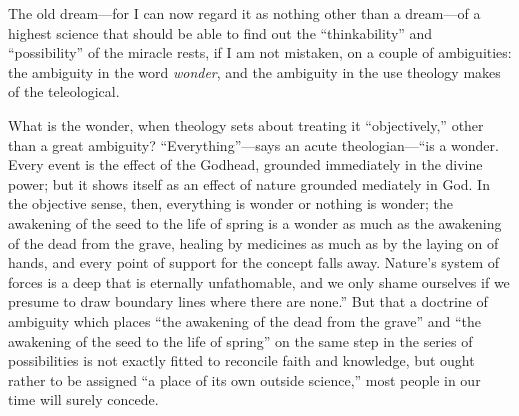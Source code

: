 \documentclass[12pt,a4paper]{article}
\begin{document}
The old dream---for I can now regard it as nothing other than a
dream---of a highest science that should be able to find out the
``thinkability'' and ``possibility'' of the miracle rests, if I am
not mistaken, on a couple of ambiguities: the ambiguity in the word
\emph{wonder}, and the ambiguity in the use theology makes of the
teleological.

What is the wonder, when theology sets about treating it
``objectively,'' other than a great ambiguity? ``Everything''---says
an acute theologian---``is a wonder. Every event is the effect of
the Godhead, grounded immediately in the divine power; but it shows
itself as an effect of nature grounded mediately in God. In the
objective sense, then, everything is wonder or nothing is wonder;
the awakening of the seed to the life of spring is a wonder as much
as the awakening of the dead from the grave, healing by medicines as
much as by the laying on of hands, and every point of support for
the concept falls away. Nature's system of forces is a deep that is
eternally unfathomable, and we only shame ourselves if we presume to
draw boundary lines where there are none.'' But that a doctrine of
ambiguity which places ``the awakening of the dead from the grave''
and ``the awakening of the seed to the life of spring'' on the same
step in the series of possibilities is not exactly fitted to
reconcile faith and knowledge, but ought rather to be assigned ``a
place of its own outside science,'' most people in our time will
surely concede.
\end{document}
